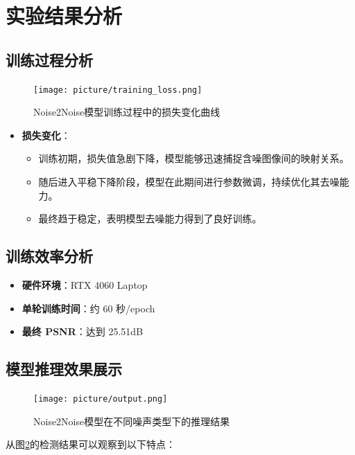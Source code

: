 \documentclass[UTF8]{ctexart}
\begin{document}
\section{实验结果分析}

\subsection{训练过程分析}
\begin{figure}[htbp]
    \centering
    \texttt{[image: picture/training\_loss.png]}
    \caption{Noise2Noise模型训练过程中的损失变化曲线}
    \label{fig:training_curve}
\end{figure}

\begin{itemize}
    \item \textbf{损失变化}：
    \begin{itemize}
        \item 训练初期，损失值急剧下降，模型能够迅速捕捉含噪图像间的映射关系。
        \item 随后进入平稳下降阶段，模型在此期间进行参数微调，持续优化其去噪能力。
        \item 最终趋于稳定，表明模型去噪能力得到了良好训练。
    \end{itemize}
\end{itemize}

\subsection{训练效率分析}
\begin{itemize}
    \item \textbf{硬件环境}：RTX 4060 Laptop
    \item \textbf{单轮训练时间}：约 60 秒/epoch
    \item \textbf{最终 PSNR}：达到 25.51dB
\end{itemize}

\subsection{模型推理效果展示}

\begin{figure}[htbp]
    \centering
    \texttt{[image: picture/output.png]}
    \caption{Noise2Noise模型在不同噪声类型下的推理结果}
    \label{fig:detection_results}
\end{figure}

从图\ref{fig:detection_results}的检测结果可以观察到以下特点：
\end{document}
